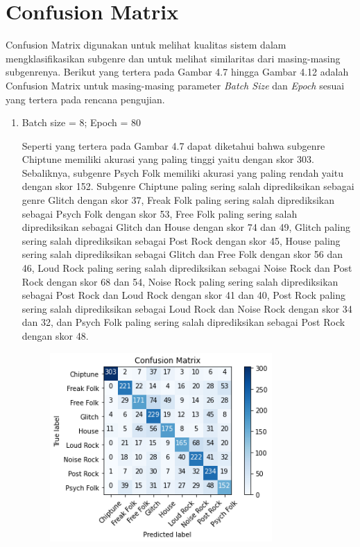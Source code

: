 \section{Confusion Matrix}
\label{sec:confusionmatrix}
Confusion Matrix digunakan untuk melihat kualitas sistem dalam mengklasifikasikan subgenre dan untuk melihat similaritas dari masing-masing subgenrenya. Berikut yang tertera pada Gambar 4.7 hingga Gambar 4.12 adalah Confusion Matrix untuk masing-masing parameter \emph{Batch Size} dan \emph{Epoch} sesuai yang tertera pada rencana pengujian.

\begin{enumerate}
	\item Batch size = 8; Epoch = 80
	
	Seperti yang tertera pada Gambar 4.7 dapat diketahui bahwa subgenre Chiptune memiliki akurasi yang paling tinggi yaitu dengan skor 303. Sebaliknya, subgenre Psych Folk memiliki akurasi yang paling rendah yaitu dengan skor 152. Subgenre Chiptune paling sering salah diprediksikan sebagai genre Glitch dengan skor 37, Freak Folk paling sering salah diprediksikan sebagai Psych Folk dengan skor 53, Free Folk paling sering salah diprediksikan sebagai Glitch dan House dengan skor 74 dan 49, Glitch paling sering salah diprediksikan sebagai Post Rock dengan skor 45, House paling sering salah diprediksikan sebagai Glitch dan Free Folk dengan skor 56 dan 46, Loud Rock paling sering salah diprediksikan sebagai Noise Rock dan Post Rock dengan skor 68 dan 54, Noise Rock paling sering salah diprediksikan sebagai Post Rock dan Loud Rock dengan skor 41 dan 40, Post Rock paling sering salah diprediksikan sebagai Loud Rock dan Noise Rock dengan skor 34 dan 32, dan Psych Folk paling sering salah diprediksikan sebagai Post Rock dengan skor 48. 
	
	\begin{figure}[H]
		\centering
		
		\includegraphics[width=0.8\textwidth]{gambar/confusion matrix_b8_e80}
		

\end{figure}
\end{enumerate}

